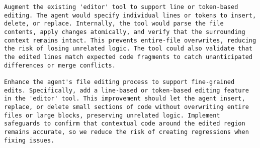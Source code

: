 \begin{lstlisting}
Augment the existing 'editor' tool to support line or token-based editing. The agent would specify individual lines or tokens to insert, delete, or replace. Internally, the tool would parse the file contents, apply changes atomically, and verify that the surrounding context remains intact. This prevents entire-file overwrites, reducing the risk of losing unrelated logic. The tool could also validate that the edited lines match expected code fragments to catch unanticipated differences or merge conflicts.

Enhance the agent's file editing process to support fine-grained edits. Specifically, add a line-based or token-based editing feature in the 'editor' tool. This improvement should let the agent insert, replace, or delete small sections of code without overwriting entire files or large blocks, preserving unrelated logic. Implement safeguards to confirm that contextual code around the edited region remains accurate, so we reduce the risk of creating regressions when fixing issues.
\end{lstlisting}